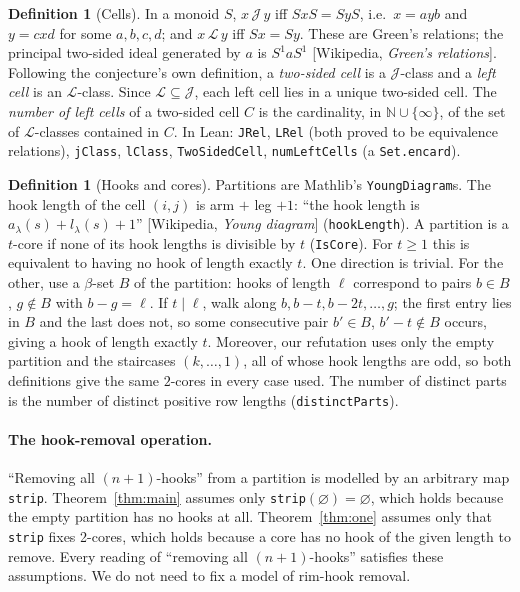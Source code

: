 \documentclass[11pt]{article}
\theoremstyle{definition}
\newtheorem{definition}[theorem]{Definition}
\theoremstyle{remark}
\renewcommand{\_}{\oldus\allowbreak}
\begin{document}
\begin{definition}[Cells]
In a monoid $S$, $x\,\mathcal J\,y$ iff $SxS=SyS$, i.e.\ $x=ayb$ and $y=cxd$ for some $a,b,c,d$; and
$x\,\mathcal L\,y$ iff $Sx=Sy$. These are Green's relations; the principal two-sided ideal generated by
$a$ is $S^1aS^1$ [Wikipedia, \emph{Green's relations}]. Following the conjecture's own definition, a
\emph{two-sided cell} is a $\mathcal J$-class and a \emph{left cell} is an $\mathcal L$-class. Since
$\mathcal L\subseteq\mathcal J$, each left cell lies in a unique two-sided cell. The \emph{number of left
cells} of a two-sided cell $C$ is the cardinality, in $\mathbb N\cup\{\infty\}$, of the set of
$\mathcal L$-classes contained in $C$. In Lean: \texttt{JRel}, \texttt{LRel} (both proved to be equivalence
relations), \texttt{jClass}, \texttt{lClass}, \texttt{TwoSidedCell}, \texttt{numLeftCells} (a
\texttt{Set.encard}).
\end{definition}

\begin{definition}[Hooks and cores]
Partitions are Mathlib's \texttt{YoungDiagram}s. The hook length of the cell $(i,j)$ is arm $+$ leg $+1$:
``the hook length is $a_\lambda(s)+l_\lambda(s)+1$'' [Wikipedia, \emph{Young diagram}]
(\texttt{hookLength}). A partition is a $t$-core if none of its hook lengths is divisible by $t$
(\texttt{IsCore}). For $t\ge 1$ this is equivalent to having no hook of length exactly $t$. One direction
is trivial. For the other, use a $\beta$-set $B$ of the partition: hooks of length $\ell$ correspond to pairs
$b\in B$, $g\notin B$ with $b-g=\ell$. If $t\mid \ell$, walk along $b, b-t, b-2t,\dots, g$; the first entry lies
in $B$ and the last does not, so some consecutive pair $b'\in B$, $b'-t\notin B$ occurs, giving a hook of
length exactly $t$. Moreover, our refutation uses only the empty partition and the staircases
$(k,\dots,1)$, all of whose hook lengths are odd, so both definitions give the same $2$-cores in every case used.
The number
of distinct parts is the number of distinct positive row lengths (\texttt{distinctParts}).
\end{definition}

\paragraph{The hook-removal operation.} ``Removing all $(n+1)$-hooks'' from a partition is modelled by an
arbitrary map \texttt{strip}. Theorem~\ref{thm:main} assumes only \texttt{strip}$(\varnothing)=\varnothing$,
which holds because the empty partition has no hooks at all. Theorem~\ref{thm:one} assumes only that
\texttt{strip} fixes 2-cores, which holds because a core has no hook of the given length to remove. Every
reading of ``removing all $(n+1)$-hooks'' satisfies these assumptions. We do not need to fix a model of
rim-hook removal.
\end{document}
